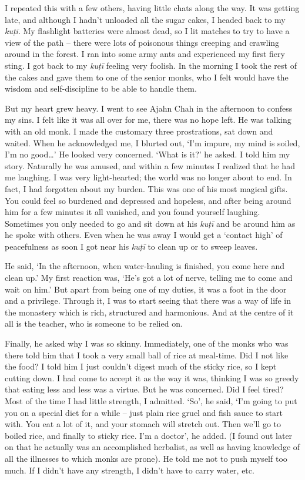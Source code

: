 I repeated this with a few others, having little chats along the way. It
was getting late, and although I hadn't unloaded all the sugar cakes, I
headed back to my \emph{kuṭī}. My flashlight batteries were almost dead, 
so I lit matches to try to have a view of the path -- there were lots of
poisonous things creeping and crawling around in the forest. I ran into
some army ants and experienced my first fiery sting. I got back to my
\emph{kuṭī} feeling very foolish. In the morning I took the rest of the
cakes and gave them to one of the senior monks, who I felt would have
the wisdom and self-discipline to be able to handle them. 

But my heart grew heavy. I went to see Ajahn Chah in the afternoon to
confess my sins. I felt like it was all over for me, there was no hope
left. He was talking with an old monk. I made the customary three
prostrations, sat down and waited. When he acknowledged me, I blurted
out, `I'm impure, my mind is soiled, I'm no good\ldots{}' He looked very
concerned. `What is it?' he asked. I told him my story. Naturally he was
amused, and within a few minutes I realized that he had me laughing. I
was very light-hearted; the world was no longer about to end. In fact, I
had forgotten about my burden. This was one of his most magical gifts. 
You could feel so burdened and depressed and hopeless, and after being
around him for a few minutes it all vanished, and you found yourself
laughing. Sometimes you only needed to go and sit down at his
\emph{kuṭī} and be around him as he spoke with others. Even when he was
away I would get a `contact high' of peacefulness as soon I got near his
\emph{kuṭī} to clean up or to sweep leaves. 

He said, `In the afternoon, when water-hauling is finished, you come
here and clean up.' My first reaction was, `He's got a lot of nerve, 
telling me to come and wait on him.' But apart from being one of my
duties, it was a foot in the door and a privilege. Through it, I was to
start seeing that there was a way of life in the monastery which is
rich, structured and harmonious. And at the centre of it all is the
teacher, who is someone to be relied on. 

Finally, he asked why I was so skinny. Immediately, one of the monks who
was there told him that I took a very small ball of rice at meal-time. 
Did I not like the food? I told him I just couldn't digest much of the
sticky rice, so I kept cutting down. I had come to accept it as the way
it was, thinking I was so greedy that eating less and less was a virtue. 
But he was concerned. Did I feel tired? Most of the time I had little
strength, I admitted. `So', he said, `I'm going to put you on a special
diet for a while -- just plain rice gruel and fish sauce to start with. 
You eat a lot of it, and your stomach will stretch out. Then we'll go to
boiled rice, and finally to sticky rice. I'm a doctor', he added. (I
found out later on that he actually was an accomplished herbalist, as
well as having knowledge of all the illnesses to which monks are prone). 
He told me not to push myself too much. If I didn't have any strength, I
didn't have to carry water, etc. 

